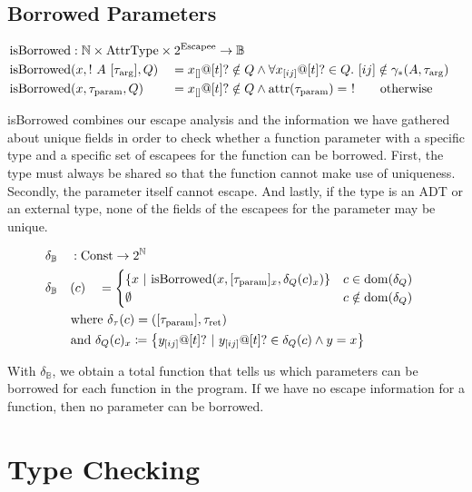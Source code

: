 \subsection{Borrowed Parameters}

\newcommand{\isBorrowed}{\mathrm{isBorrowed}}

\begin{alignat*}{3}
	\isBorrowed &: \mathrlap{\mathbb{N} \times \AttrType \times 2^{\Escapee} \to \mathbb{B}} \\
	\isBorrowed&(x, !\ A\ [\tau_\arrg], Q) &&= x_{[]}@[t]? \notin Q \land \forall x_{[ij]}@[t]? \in Q.\ [ij] \notin \gamma_*(A, \tau_\arrg) \\
	\isBorrowed&(x, \tau_\param, Q) &&= x_{[]}@[t]? \notin Q \land \attr(\tau_\param) =\ ! \qquad\text{otherwise}
\end{alignat*}

isBorrowed combines our escape analysis and the information we have gathered about unique fields in order to check whether a function parameter with a specific type and a specific set of escapees for the function can be borrowed. First, the type must always be shared so that the function cannot make use of uniqueness. Secondly, the parameter itself cannot escape. And lastly, if the type is an ADT or an external type, none of the fields of the escapees for the parameter may be unique.

\begin{alignat*}{3}
	&\delta_\mathbb{B} &&: \mathrlap{\Const \to 2^\mathbb{N}} \\
	&\delta_\mathbb{B}&&(c) &&= \begin{cases}
		\left\{x \ |\ \isBorrowed(x, [\tau_\param]_x, \delta_Q(c)_x) \right\} & c \in \dom(\delta_Q) \\
		\emptyset & c \notin \dom(\delta_Q)
	\end{cases}\\
	&\rebreak{\text{where}\ \delta_\tau(c) = ([\tau_\param], \tau_\ret)} \\
	&\rebreak{\text{and}\ \delta_Q(c)_x \coloneqq \left\{y_{[ij]}@[t]? \ |\ y_{[ij]}@[t]? \in \delta_Q(c) \land y = x \right\}}
\end{alignat*}

With $\delta_\mathbb{B}$, we obtain a total function that tells us which parameters can be borrowed for each function in the program. If we have no escape information for a function, then no parameter can be borrowed.

\section{Type Checking}\label{sec:checking}

